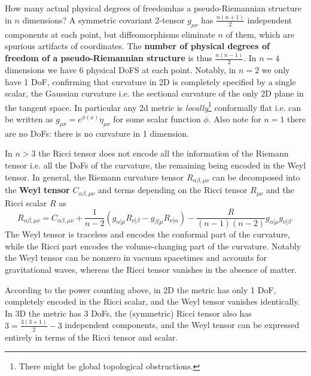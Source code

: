 \begin{mytheorem}
How many  actual physical degrees of freedomhas a pseudo-Riemannian structure in \(n\) dimensions?
A symmetric covariant 2-tensor \(g_{\mu \nu}\) has \(\frac{n(n+1)}{2}\) independent components at each point, but diffeomorphisms eliminate \(n\) of them, which are spurious artifacts of coordinates.
The \textbf{number of physical degrees of freedom of a pseudo-Riemannian structure} is thus \(\frac{n(n-1)}{2}\).
In \(n=4\) dimensions we have 6 physical DoFS at each point.
Notably, in $n=2$ we only have 1 DoF, confirming that curvature in 2D is completely specified by a single scalar, the Gaussian curvature i.e. the sectional curvature of the only 2D plane in the tangent space.
In particular any 2d metric is \emph{locally}\footnote{There might be global topological obstructions.} conformally flat i.e. can be written as \(g_{\mu\nu}=e^{\phi(x)}\eta_{\mu\nu}\) for some scalar function \(\phi\).
Also note for $n=1$ there are no DoFs: there is no curvature in 1 dimension.
%
\end{mytheorem}


\begin{mytheorem}
%
In $n>3$ the Ricci tensor does not encode all the information of the Riemann tensor i.e. all the DoFs of the curvature, the remaining being encoded in the Weyl tensor.
In general, the Riemann curvature tensor \(R_{\alpha \beta, \mu \nu}\) can be decomposed into the \textbf{Weyl tensor} \(C_{\alpha \beta, \mu \nu}\) and terms depending on the Ricci tensor \(R_{\mu \nu}\) and the Ricci scalar \(R\) as
\begin{equation}
    R_{\alpha \beta, \mu \nu} = C_{\alpha \beta, \mu \nu} + \frac{1}{n-2} \left( g_{\alpha [\mu} R_{\nu] \beta} - g_{\beta [\mu} R_{\nu] \alpha} \right) - \frac{R}{(n-1)(n-2)} g_{\alpha [\mu} g_{\nu] \beta}.
\end{equation}
The Weyl tensor is traceless and encodes the conformal part of the curvature, while the Ricci part encodes the volume-changing part of the curvature.
Notably the Weyl tensor can be nonzero in vacuum spacetimes and accounts for gravitational waves, whereas the Ricci tensor vanishes in the absence of matter.

According to the power counting above, in 2D the metric has only 1 DoF, completely encoded in the Ricci scalar, and the Weyl tensor vanishes identically.
In 3D the metric has 3 DoFs, the (symmetric) Ricci tensor also has $3=\frac{3(3+1)}{2}-3$ independent components, and the Weyl tensor can be expressed entirely in terms of the Ricci tensor and scalar.
%
\end{mytheorem}





